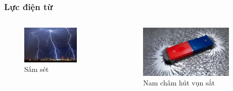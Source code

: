 \begin{frame}
\frametitle{Lực điện từ}
\begin{columns}
\begin{column}{0.5\textwidth}
    \begin{figure}
    \centering
    \includegraphics[width=0.775\textwidth]{Slides/Figure/thunder.jpg}
    \caption{Sấm sét}
    \end{figure}
\end{column}
\begin{column}{0.5\textwidth}
    \begin{figure}
    \centering
    \includegraphics[width=0.9\textwidth]{Slides/Figure/magnet.jpg}
    \caption{Nam châm hút vụn sắt}
    \end{figure}
\end{column}
\end{columns}
\end{frame}

